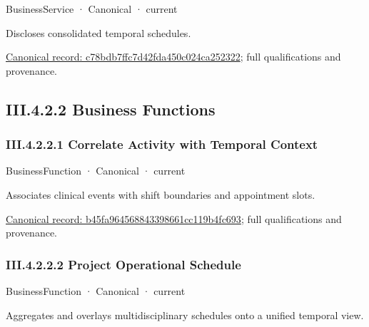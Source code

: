 \label{element:c78bdb7ffc7d42fda450c024ca252322}
{\small BusinessService · Canonical · current}\par

Discloses consolidated temporal schedules.


{\footnotesize \href{../../../../continuum/business/business-service/c78bdb7ffc7d42fda450c024ca252322.md}{Canonical record: c78bdb7ffc7d42fda450c024ca252322}; full qualifications and provenance.}\par
\subsection*{III.4.2.2 Business Functions}
\label{navigation:III.4.2.2}

\subsubsection*{III.4.2.2.1 Correlate Activity with Temporal Context}
\label{navigation:III.4.2.2.1}

\label{element:b45fa964568843398661cc119b4fc693}
{\small BusinessFunction · Canonical · current}\par

Associates clinical events with shift boundaries and appointment slots.


{\footnotesize \href{../../../../continuum/business/business-function/b45fa964568843398661cc119b4fc693.md}{Canonical record: b45fa964568843398661cc119b4fc693}; full qualifications and provenance.}\par
\subsubsection*{III.4.2.2.2 Project Operational Schedule}
\label{navigation:III.4.2.2.2}

\label{element:3ca2e6a5ca614df991a2e1a060f0f1d8}
{\small BusinessFunction · Canonical · current}\par

Aggregates and overlays multidisciplinary schedules onto a unified temporal view.



